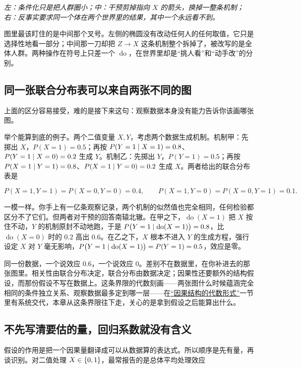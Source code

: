\emph{左：条件化只是把人群圈小；中：干预剪掉指向 \(X\) 的箭头，换掉一整条机制；右：反事实要求同一个体在两个世界里的结果，其中一个永远看不到。}

图里最该盯住的是中间那个叉号。左侧的椭圆没有改动任何人的任何取值，它只是选择性地看一部分；中间那一刀却把 \(Z\to X\) 这条机制整个拆掉了，被改写的是全体人群。两种操作在符号上只差一个 \(\operatorname{do}\)，在世界里却是``挑人看''和``动手改''的分别。

\subsection{同一张联合分布表可以来自两张不同的图}

上面的区分容易接受，难的是接下来这句：观察数据本身没有能力告诉你该画哪张图。

举个能算到底的例子。两个二值变量 \(X,Y\)，考虑两个数据生成机制。机制甲：先掷出 \(X\)，\(P(X=1)=0.5\)；再按 \(P(Y=1\mid X=1)=0.8\)、\(P(Y=1\mid X=0)=0.2\) 生成 \(Y\)。机制乙：先掷出 \(Y\)，\(P(Y=1)=0.5\)；再按 \(P(X=1\mid Y=1)=0.8\)、\(P(X=1\mid Y=0)=0.2\) 生成 \(X\)。两者给出的联合分布表是

\[
P(X=1,Y=1)=P(X=0,Y=0)=0.4,
\qquad
P(X=1,Y=0)=P(X=0,Y=1)=0.1.
\]

一模一样。你手上有一亿条观察记录，两个机制的似然值也完全相同，任何检验都区分不了它们。但两者对干预的回答南辕北辙。在甲之下，\(\operatorname{do}(X=1)\) 把 \(X\) 按住不动，\(Y\) 的机制原封不动地跑，于是 \(P\bigl(Y=1\mid\operatorname{do}(X=1)\bigr)=0.8\)，比 \(\operatorname{do}(X=0)\) 时的 \(0.2\) 高出 \(0.6\)。在乙之下，\(X\) 根本不进入 \(Y\) 的生成方程，强行设定 \(X\) 对 \(Y\) 毫无影响，\(P\bigl(Y=1\mid\operatorname{do}(X=1)\bigr)=P(Y=1)=0.5\)，效应是零。

同一份数据，一个说效应 \(0.6\)，一个说效应 \(0\)。差别不在数据里，在你补进去的那张图里。相关性由联合分布决定，联合分布由数据决定；因果性还要额外的结构假设，而那份假设不写在数据上。这条界限的代数刻画——两张图什么时候蕴涵完全相同的条件独立关系、观察数据最多定到哪一层——在\hyperref[sec:12-Real-Analysis-Support/10-Essential-Structures/04]{``因果结构的代数形式''}一节里有系统交代，本章从这条界限往下走，关心的是拿到假设之后能算出什么。

\subsection{不先写清要估的量，回归系数就没有含义}

假设的作用是把一个因果量翻译成可以从数据算的表达式。所以顺序是先有量，再谈识别。对二值处理 \(X\in\left\{0,1\right\}\)，最常报告的是总体平均处理效应

